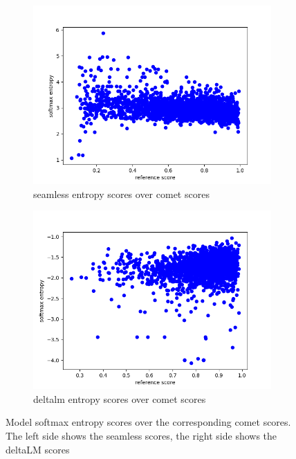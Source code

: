 \begin{figure}[ht]
        \centering%
    \begin{subfigure}{0.4\linewidth}
        \includegraphics[width=\textwidth]{Latex/sections/images/seamlessentropy.png}
        \caption{seamless entropy scores over comet scores}
    \end{subfigure}
    \begin{subfigure}{0.4\linewidth}
        \includegraphics[width=\textwidth]{Latex/sections/images/dlmentropy.png}
        \caption{deltalm entropy scores over comet scores}
    \end{subfigure}
    \caption{Model softmax entropy scores over the corresponding comet scores. The left side shows the seamless scores, the right side shows the deltaLM scores}
    \label{fig:translationeval scatter plot entropy}
\end{figure}

